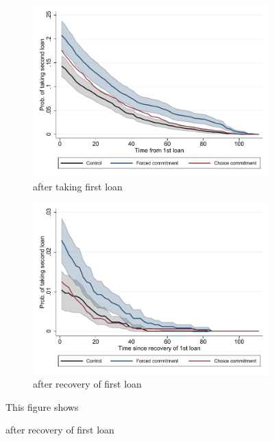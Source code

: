 \documentclass[oneside,11pt]{article}
\begin{document}
\begin{figure}[H]
     \caption{Probability of ever pawning again}
    \label{prob_ever_pawn}
    \begin{center}
    \begin{subfigure}{0.49\textwidth}
     \caption{after taking first loan}
        \centering
        \includegraphics[width=\textwidth]{Figuras/prob_reincidence.pdf}
    \end{subfigure}
    \begin{subfigure}{0.49\textwidth}
     \caption{after recovery of first loan}
        \centering
        \includegraphics[width=\textwidth]{Figuras/prob_reincidence_des.pdf}
    \end{subfigure}    
    \end{center}
    \scriptsize
    This figure shows
\end{figure}
\end{document}
